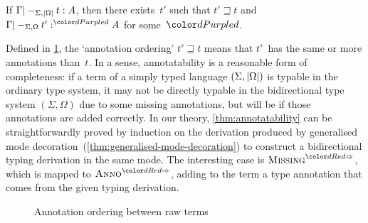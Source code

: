 \begin{proposition}[Annotatability]\label{thm:annotatability}
If $\Gamma |-_{\Sigma,\left|\Omega\right|} t : A$, then there exists~$t'$ such that $t' \sqsupseteq t$ and $\Gamma |-_{\Sigma,\Omega} t' :^\dir{d} A$ for some~$\dir{d}$.
\end{proposition}
Defined in \cref{fig:annotation-ordering}, the `annotation ordering' $t' \sqsupseteq t$ means that $t'$~has the same or more annotations than~$t$.
In a sense, annotatability is a reasonable form of completeness: if a term of a simply typed language $(\Sigma, \left|\Omega\right|)$ is typable in the ordinary type system, it may not be directly typable in the bidirectional type system $(\Sigma, \Omega)$ due to some missing annotations, but will be if those annotations are added correctly.
In our theory, \cref{thm:annotatability} can be straightforwardly proved by induction on the derivation produced by generalised mode decoration~(\cref{thm:generalised-mode-decoration}) to construct a bidirectional typing derivation in the same mode.
The interesting case is $\SynRule{Missing}$, which is mapped to $\SynRule{Anno}$, adding to the term a type annotation that comes from the given typing derivation.
\begin{figure}
  \centering\small
  \caption{Annotation ordering between raw terms}
  \label{fig:annotation-ordering}
\end{figure}

